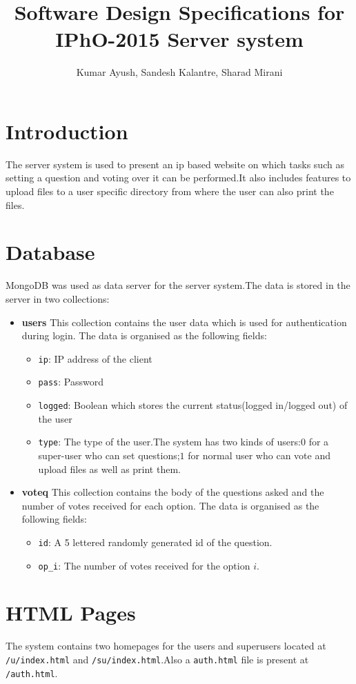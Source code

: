 \documentclass[a4paper,10pt]{article}
\title{Software Design Specifications for IPhO-2015 Server system}
\author{Kumar Ayush, Sandesh Kalantre, Sharad Mirani}
\date{}
\begin{document}
\maketitle

\tableofcontents
\section{Introduction}
The server system is used to present an ip based website on which tasks such as
setting a question and voting over it can be performed.It also includes features 
to upload files to a user specific directory from where the user can also print the
files.

\section{Database}
MongoDB was used as data server for the server system.The data is stored in the server
in two collections:
\begin{itemize}
 \item \textbf{users}
 This collection contains the user data which is used for authentication during login.
 The data is organised as the following fields:
 \begin{itemize}
  \item \texttt{ip}: IP address of the client
  \item \texttt{pass}: Password
  \item \texttt{logged}: Boolean which stores the current status(logged in/logged out) of the user
  \item \texttt{type}: The type of the user.The system has two kinds of users:$0$ for a super-user
  who can set questions;$1$ for normal user who can vote and upload files as well as print them.
 \end{itemize}
 \item \textbf{voteq}
 This collection contains the body of the questions asked and the number of votes received for each option.
 The data is organised as the following fields:
 \begin{itemize}
  \item \texttt{id}: A 5 lettered randomly generated id of the question.
  \item \texttt{op\_i}: The number of votes received for the option $i$.
 \end{itemize}
\end{itemize}
\section{HTML Pages}
The system contains two homepages for the users and superusers located at
\texttt{/u/index.html} and \texttt{/su/index.html}.Also a \texttt{auth.html} file
is present at \texttt{/auth.html}.
\end{document}
